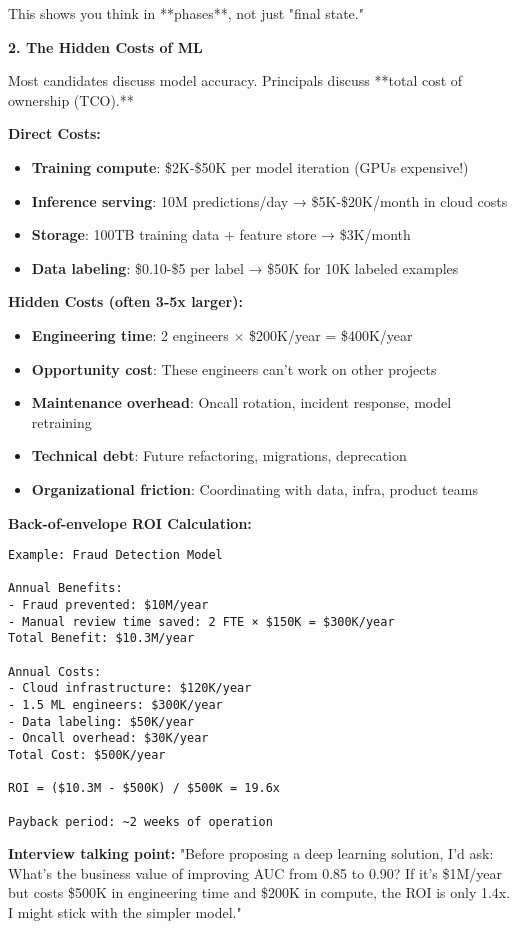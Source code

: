 \documentclass[10pt]{article}
\begin{document}
This shows you think in **phases**, not just "final state."

\textbf{2. The Hidden Costs of ML}

Most candidates discuss model accuracy. Principals discuss **total cost of ownership (TCO).**

\textbf{Direct Costs:}
\begin{itemize}
\item \textbf{Training compute}: \$2K-\$50K per model iteration (GPUs expensive!)
\item \textbf{Inference serving}: 10M predictions/day → \$5K-\$20K/month in cloud costs
\item \textbf{Storage}: 100TB training data + feature store → \$3K/month
\item \textbf{Data labeling}: \$0.10-\$5 per label → \$50K for 10K labeled examples
\end{itemize}

\textbf{Hidden Costs (often 3-5x larger):}
\begin{itemize}
\item \textbf{Engineering time}: 2 engineers × \$200K/year = \$400K/year
\item \textbf{Opportunity cost}: These engineers can't work on other projects
\item \textbf{Maintenance overhead}: Oncall rotation, incident response, model retraining
\item \textbf{Technical debt}: Future refactoring, migrations, deprecation
\item \textbf{Organizational friction}: Coordinating with data, infra, product teams
\end{itemize}

\textbf{Back-of-envelope ROI Calculation:}

\begin{verbatim}
Example: Fraud Detection Model

Annual Benefits:
- Fraud prevented: $10M/year
- Manual review time saved: 2 FTE × $150K = $300K/year
Total Benefit: $10.3M/year

Annual Costs:
- Cloud infrastructure: $120K/year
- 1.5 ML engineers: $300K/year
- Data labeling: $50K/year
- Oncall overhead: $30K/year
Total Cost: $500K/year

ROI = ($10.3M - $500K) / $500K = 19.6x

Payback period: ~2 weeks of operation
\end{verbatim}

\textbf{Interview talking point:} "Before proposing a deep learning solution, I'd ask: What's the business value of improving AUC from 0.85 to 0.90? If it's \$1M/year but costs \$500K in engineering time and \$200K in compute, the ROI is only 1.4x. I might stick with the simpler model."
\end{document}
